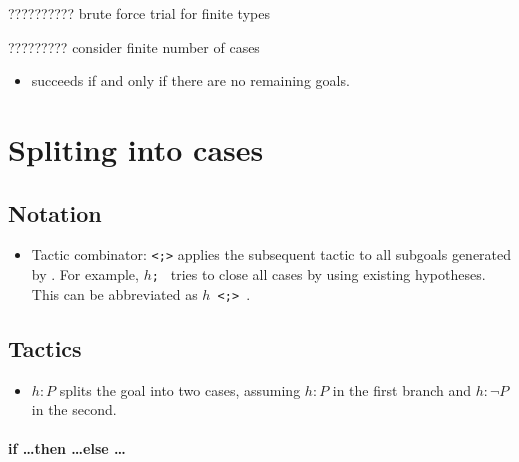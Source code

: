 \documentclass[a4paper]{article}
\begin{document}

 ?????????? brute force trial for finite types

 ????????? consider finite number of cases


\begin{itemize}
    \item \done succeeds if and only if there are no remaining goals.
\end{itemize}





\section{Spliting into cases}

\subsection*{Notation}

\begin{itemize}
    \item Tactic combinator: \texttt{<;>} applies the subsequent tactic to all subgoals generated by \ccases.
    For example, \texttt{\ccases $h$; \rrepeat \assumption} tries to close all cases by using existing hypotheses. This can be abbreviated as \texttt{\ccases $h$ <;> \assumption}.
\end{itemize}

\subsection*{Tactics}


\begin{itemize}
    \item \texttt{\bycases $h : P$} splits the goal into two cases, assuming $h : P$ in the first branch and $h : \neg P$ in the second.
\end{itemize}

\paragraph{if \dots then \dots else \dots}
\end{document}
